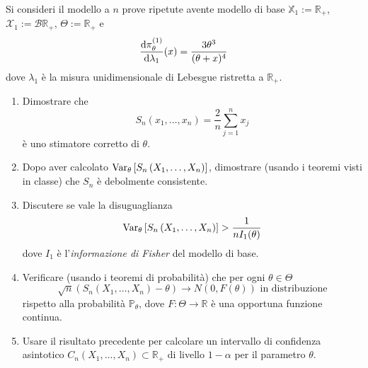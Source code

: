 \begin{esercizio}[Problema 3, 12/09/2024]
  Si consideri il modello a \(n\) prove ripetute avente modello di
  base \(\mathbb{X}_1 := \mathbb{R}_+\),
  \(\mathcal{X}_1 := \mathcal{B} \mathbb{R}_+\),
  \(\Theta := \mathbb{R}_+\) e
  \[
    \frac{\mathrm d \pi_{\theta}^{(1)}}{\mathrm d \lambda_1}(x) =
    \frac{3\theta^3}{(\theta + x)^4}
  \]
  dove \(\lambda_1\) è la misura unidimensionale di Lebesgue ristretta
  a \(\mathbb{R}_+\).
  \begin{enumerate}[leftmargin=*]
  \item Dimostrare che
    \[
      S_n (x_1, \dots{}, x_n) = \frac 2 n \sum_{j=1}^nx_j
    \]
    è uno stimatore corretto di \(\theta\).

  \item Dopo aver calcolato
    \(\operatorname{Var}_\theta \left[ S_n\left( X_1, \dots{}, X_n \right)
    \right]\), dimostrare (usando i teoremi visti in classe) che
    \(S_n\) è debolmente consistente.
    
  \item Discutere se vale la disuguaglianza
    \[
      \operatorname{Var}_\theta \left[ S_n\left( X_1, \dots{}, X_n \right) \right] >
      \frac{1}{n I_1(\theta)}
    \]
    dove \(I_1\) è l'{\em informazione di Fisher} del modello di base.
    
  \item Verificare (usando i teoremi di probabilità) che per ogni
    \(\theta \in \Theta\)
    \[
      \sqrt{n} \left( S_n\left( X_1, \dots{}, X_n \right) - \theta
      \right) \to N(0, F(\theta)) \text{ in distribuzione}
    \]
    rispetto alla probabilità \(\mathbb{P}_\theta\), dove
    \(F : \Theta \to \mathbb{R}\) è una opportuna funzione continua.

  \item Usare il risultato precedente per calcolare un intervallo di
    confidenza asintotico
    \(C_n(X_1, \dots{}, X_n) \subset \mathbb{R}_+\) di livello
    \(1-\alpha\) per il parametro \(\theta\).
  \end{enumerate}
\end{esercizio}

